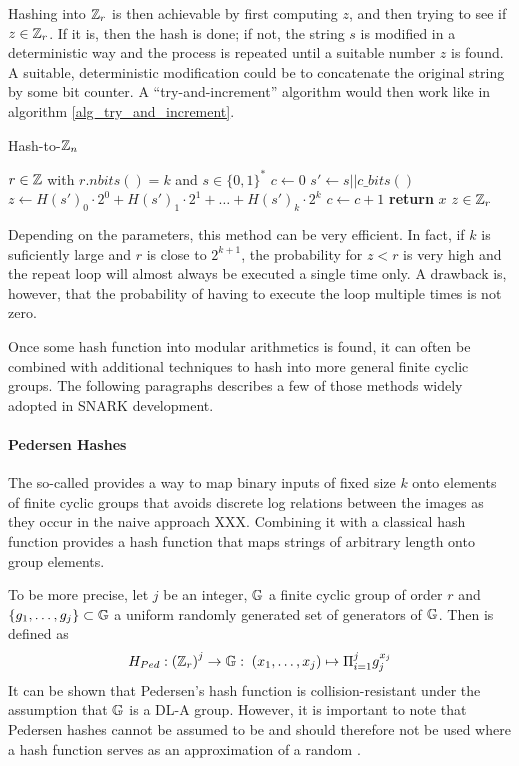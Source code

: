 Hashing into $\mathbb{Z}_r$ is then achievable by first computing $z$, and then trying to see if $z\in\mathbb{Z}_r$. If it is, then the hash is done; if not, the string $s$ is modified in a deterministic way and the process is repeated until a suitable number $z$ is found. A suitable, deterministic modification could be to concatenate the original string by some bit counter. A ``try-and-increment'' algorithm would then work like in algorithm \ref{alg_try_and_increment}.
\begin{algorithm}\caption{Hash-to-$\mathbb{Z}_n$}
\label{alg_try_and_increment}
\begin{algorithmic}[0]
\Require $r \in \mathbb{Z}$ with $r.nbits()=k$ and $s\in\{0,1\}^*$
\State $c \gets 0$
\Repeat
\State $s' \gets s||c\_bits()$
\State $z \gets H(s')_0\cdot 2^0 + H(s')_1\cdot 2^1 + \ldots + H(s')_{k}\cdot 2^{k}$
\State $c\gets c+1$
\State \textbf{return} $x$
\EndProcedure
\Ensure $ z\in \mathbb{Z}_r$
\end{algorithmic}
\end{algorithm}

Depending on the parameters, this method can be very efficient. In fact, if $k$ is suficiently large and $r$ is close to $2^{k+1}$, the probability for $z<r$ is very high and the repeat loop will almost always be executed a single time only. A drawback is, however, that the probability of having to execute the loop multiple times is not zero. 

Once some hash function into modular arithmetics is found, it can often be combined with additional techniques to hash into more general finite cyclic groups. The following paragraphs describes a few of those methods widely adopted in SNARK development.
\paragraph{Pedersen Hashes}

The so-called  \citep{Pedersen92} provides a way to map binary inputs of fixed size $k$ onto elements of finite cyclic groups that avoids discrete log relations between the images as they occur in the naive approach XXX. Combining it with a classical hash function provides a hash function that maps strings of arbitrary length onto group elements. 

To be more precise, let $j$ be an integer, $\mathbb{G}$ a finite cyclic group of order $r$ and $\{g_1, \ldots, g_j\} \subset \mathbb{G}$ a uniform randomly generated set of generators of $\mathbb{G}$. Then  is defined as
\begin{equation}
H_{Ped} : \left(\mathbb{Z}_r\right)^j \to \mathbb{G}:\; (x_1,\ldots,x_j)\mapsto \Pi_{i=1}^j g_j^{x_j}
\end{equation}
It can be shown that Pedersen’s  hash  function  is  collision-resistant under the assumption that $\mathbb{G}$ is a DL-A group. However, it is important to note that Pedersen hashes cannot be assumed to be  and should therefore not be used where a hash function serves as an approximation of a random .

